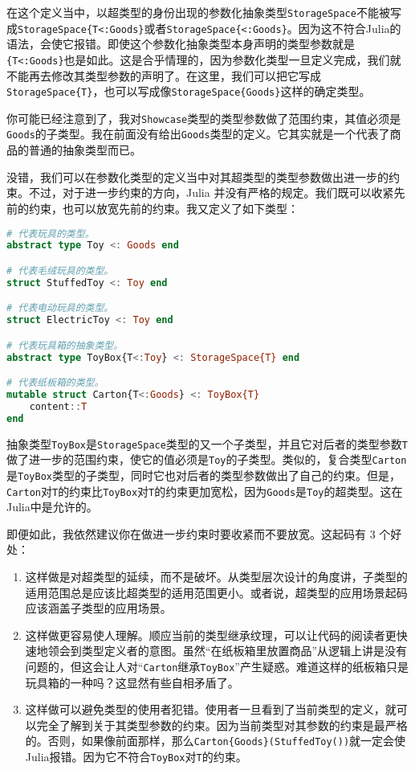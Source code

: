 在这个定义当中，以超类型的身份出现的参数化抽象类型\verb|StorageSpace|不能被写成\verb|StorageSpace{T<:Goods}|或者\verb|StorageSpace{<:Goods}|。因为这不符合Julia的语法，会使它报错。即使这个参数化抽象类型本身声明的类型参数就是\verb|{T<:Goods}|也是如此。这是合乎情理的，因为参数化类型一旦定义完成，我们就不能再去修改其类型参数的声明了。在这里，我们可以把它写成\verb|StorageSpace{T}|，也可以写成像\verb|StorageSpace{Goods}|这样的确定类型。

你可能已经注意到了，我对\verb|Showcase|类型的类型参数做了范围约束，其值必须是\verb|Goods|的子类型。我在前面没有给出\verb|Goods|类型的定义。它其实就是一个代表了商品的普通的抽象类型而已。

没错，我们可以在参数化类型的定义当中对其超类型的类型参数做出进一步的约束。不过，对于进一步约束的方向，Julia 并没有严格的规定。我们既可以收紧先前的约束，也可以放宽先前的约束。我又定义了如下类型：
\begin{lstlisting}[language=julia]
# 代表玩具的类型。
abstract type Toy <: Goods end

# 代表毛绒玩具的类型。
struct StuffedToy <: Toy end

# 代表电动玩具的类型。
struct ElectricToy <: Toy end

# 代表玩具箱的抽象类型。
abstract type ToyBox{T<:Toy} <: StorageSpace{T} end

# 代表纸板箱的类型。
mutable struct Carton{T<:Goods} <: ToyBox{T}
    content::T
end
\end{lstlisting}

抽象类型\verb|ToyBox|是\verb|StorageSpace|类型的又一个子类型，并且它对后者的类型参数\verb|T|做了进一步的范围约束，使它的值必须是\verb|Toy|的子类型。类似的，复合类型\verb|Carton|是\verb|ToyBox|类型的子类型，同时它也对后者的类型参数做出了自己的约束。但是，\verb|Carton|对\verb|T|的约束比\verb|ToyBox|对\verb|T|的约束更加宽松，因为\verb|Goods|是\verb|Toy|的超类型。这在Julia中是允许的。

即便如此，我依然建议你在做进一步约束时要收紧而不要放宽。这起码有 3 个好处：

\begin{enumerate}
\item 这样做是对超类型的延续，而不是破坏。从类型层次设计的角度讲，子类型的适用范围总是应该比超类型的适用范围更小。或者说，超类型的应用场景起码应该涵盖子类型的应用场景。
\item 这样做更容易使人理解。顺应当前的类型继承纹理，可以让代码的阅读者更快速地领会到类型定义者的意图。虽然“在纸板箱里放置商品”从逻辑上讲是没有问题的，但这会让人对“\verb|Carton|继承\verb|ToyBox|”产生疑惑。难道这样的纸板箱只是玩具箱的一种吗？这显然有些自相矛盾了。
\item 这样做可以避免类型的使用者犯错。使用者一旦看到了当前类型的定义，就可以完全了解到关于其类型参数的约束。因为当前类型对其参数的约束是最严格的。否则，如果像前面那样，那么\verb|Carton{Goods}(StuffedToy())|就一定会使Julia报错。因为它不符合\verb|ToyBox|对\verb|T|的约束。
\end{enumerate}

